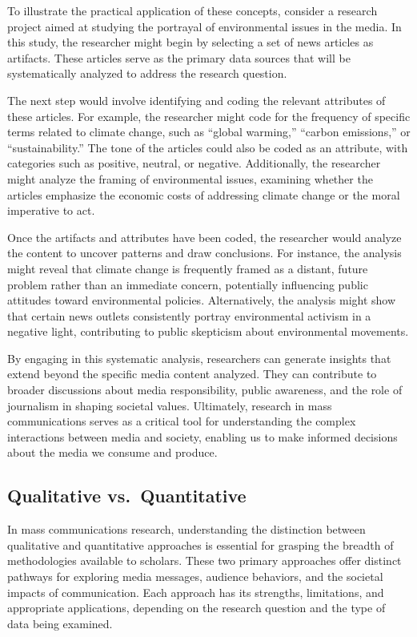 \documentclass[
]{book}
\begin{document}
To illustrate the practical application of these concepts, consider a research project aimed at studying the portrayal of environmental issues in the media. In this study, the researcher might begin by selecting a set of news articles as artifacts. These articles serve as the primary data sources that will be systematically analyzed to address the research question.

The next step would involve identifying and coding the relevant attributes of these articles. For example, the researcher might code for the frequency of specific terms related to climate change, such as ``global warming,'' ``carbon emissions,'' or ``sustainability.'' The tone of the articles could also be coded as an attribute, with categories such as positive, neutral, or negative. Additionally, the researcher might analyze the framing of environmental issues, examining whether the articles emphasize the economic costs of addressing climate change or the moral imperative to act.

Once the artifacts and attributes have been coded, the researcher would analyze the content to uncover patterns and draw conclusions. For instance, the analysis might reveal that climate change is frequently framed as a distant, future problem rather than an immediate concern, potentially influencing public attitudes toward environmental policies. Alternatively, the analysis might show that certain news outlets consistently portray environmental activism in a negative light, contributing to public skepticism about environmental movements.

By engaging in this systematic analysis, researchers can generate insights that extend beyond the specific media content analyzed. They can contribute to broader discussions about media responsibility, public awareness, and the role of journalism in shaping societal values. Ultimately, research in mass communications serves as a critical tool for understanding the complex interactions between media and society, enabling us to make informed decisions about the media we consume and produce.

\subsection*{Qualitative vs.~Quantitative}\label{qualitative-vs.-quantitative}

In mass communications research, understanding the distinction between qualitative and quantitative approaches is essential for grasping the breadth of methodologies available to scholars. These two primary approaches offer distinct pathways for exploring media messages, audience behaviors, and the societal impacts of communication. Each approach has its strengths, limitations, and appropriate applications, depending on the research question and the type of data being examined.
\end{document}
